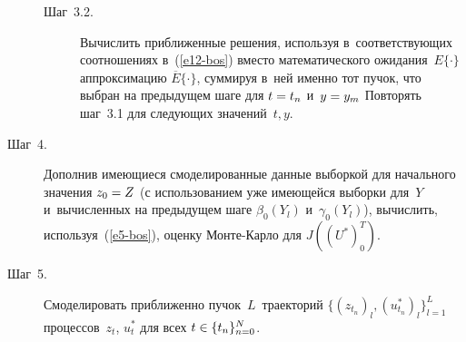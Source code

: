 \begin{multicols}{2}
\begin{description}
\begin{description}
     \item[Шаг~3.2.] Вычислить приближенные решения,   
используя в~соответствующих соотношениях в~(\ref{e12-bos}) вместо 
математического ожидания~$E\{\cdot\}$ аппроксимацию 
$\overline{E}\{\cdot\}$, суммируя в~ней именно тот пучок, что выбран на 
предыду\-щем шаге для $t\hm=t_n$ и~$y\hm=y_m$ Повторять шаг~3.1 для 
сле\-ду\-ющих значений~$t,y$.
\end{description}
     
     \item[Шаг~4.] Дополнив имеющиеся смоделированные данные выборкой для 
начального значения $z_0\hm=Z$ (с использованием уже имеющейся 
выборки для~$Y$ и~вычисленных на предыдущем шаге $\beta_0(Y_l)$ 
и~$\gamma_0(Y_l)$), вычислить, используя~(\ref{e5-bos}), оценку  
Мон\-те-Кар\-ло для $J((U^*)_0^T)$.
     
    \item[Шаг~5.] Смоделировать приближенно пучок~$L$~траекторий $\{ 
(z_{t_n})_l, (u^*_{t_n})_l\}^L_{l=1}$ процессов~$z_t$, $u_t^*$ для всех 
$t\hm\in \{t_n\}^N_{n=0}$.
\end{description}

\begin{figure*}[b] %
\vspace*{-3pt}
    \begin{center}  
  \mbox{%
 \epsfxsize=163mm 
 }
\end{center}
\vspace*{-17pt}
\begin{minipage}[t]{80mm}
\end{minipage}
\hfill
\vspace*{-17pt}
\begin{minipage}[t]{80mm}
\end{minipage}
\vspace*{12pt}
\end{figure*}
     

\end{multicols}
